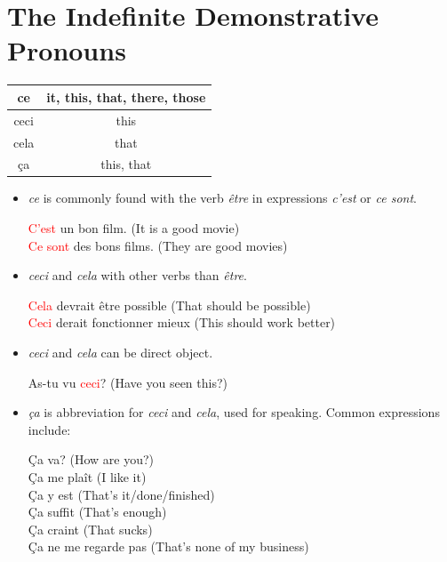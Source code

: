 \documentclass{book}
\begin{document}
    \section{The Indefinite Demonstrative Pronouns}
        \begin{center}
            \begin{tabular}{|c|c|}
                \hline
                ce & it, this, that, there, those \\
                \hline
                ceci & this \\
                \hline
                cela & that \\
                \hline
                ça & this, that \\
                \hline
            \end{tabular}
        \end{center}

        \begin{itemize}
            \item \textit{ce} is commonly found with the verb \textit{être} in expressions \textit{c'est} or \textit{ce sont}.
                \begin{center}
                    \textcolor{red}{C'est} un bon film. \quad (It is a good movie) \\
                    \textcolor{red}{Ce sont} des bons films. \quad (They are good movies)
                \end{center}   
            \item \textit{ceci} and \textit{cela} with other verbs than \textit{être}.
                \begin{center}
                    \textcolor{red}{Cela} devrait être possible \quad (That should be possible) \\
                    \textcolor{red}{Ceci} derait fonctionner mieux \quad (This should work better)
                \end{center}
            \item \textit{ceci} and \textit{cela} can be direct object.
                \begin{center}
                    As-tu vu \textcolor{red}{ceci}? \quad (Have you seen this?) \\
                \end{center}
            \item \textit{ça} is abbreviation for \textit{ceci} and \textit{cela}, used for speaking. Common expressions include:
                \begin{center}
                    Ça va? \quad (How are you?) \\
                    Ça me plaît \quad (I like it) \\
                    Ça y est \quad (That's it/done/finished) \\
                    Ça suffit \quad (That's enough) \\
                    Ça craint \quad (That sucks) \\
                    Ça ne me regarde pas \quad (That's none of my business)
                \end{center}
        \end{itemize}
\end{document}
